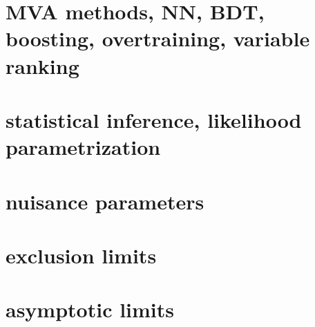 \section{ MVA methods, NN, BDT, boosting, overtraining, variable ranking  }
\section{statistical inference, likelihood parametrization}
\section{ nuisance parameters}
\section{exclusion limits }
\section{asymptotic limits }


 









